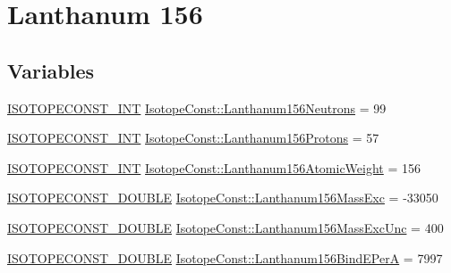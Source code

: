 \hypertarget{group___isotope_const-_lanthanum-_la156}{}\section{Lanthanum 156}
\label{group___isotope_const-_lanthanum-_la156}
\subsection*{Variables}
\begin{DoxyCompactItemize}
\item 
\mbox{\hyperlink{group___isotope_const-_macros_ga5f18360b3e99483a35c32d789e62621c}{I\+S\+O\+T\+O\+P\+E\+C\+O\+N\+S\+T\+\_\+\+I\+NT}} \mbox{\hyperlink{group___isotope_const-_lanthanum-_la156_ga9d9203bdacf6631773b13080eb435763}{Isotope\+Const\+::\+Lanthanum156\+Neutrons}} = 99
\item 
\mbox{\hyperlink{group___isotope_const-_macros_ga5f18360b3e99483a35c32d789e62621c}{I\+S\+O\+T\+O\+P\+E\+C\+O\+N\+S\+T\+\_\+\+I\+NT}} \mbox{\hyperlink{group___isotope_const-_lanthanum-_la156_ga2050811618a7c2782808d69376608865}{Isotope\+Const\+::\+Lanthanum156\+Protons}} = 57
\item 
\mbox{\hyperlink{group___isotope_const-_macros_ga5f18360b3e99483a35c32d789e62621c}{I\+S\+O\+T\+O\+P\+E\+C\+O\+N\+S\+T\+\_\+\+I\+NT}} \mbox{\hyperlink{group___isotope_const-_lanthanum-_la156_gaf8fa9b7781374ff9e8e421fa62c7e9ab}{Isotope\+Const\+::\+Lanthanum156\+Atomic\+Weight}} = 156
\item 
\mbox{\hyperlink{group___isotope_const-_macros_ga8f45a7272ce02c0b4c65c44636ed719a}{I\+S\+O\+T\+O\+P\+E\+C\+O\+N\+S\+T\+\_\+\+D\+O\+U\+B\+LE}} \mbox{\hyperlink{group___isotope_const-_lanthanum-_la156_gaaa57af68ac40b6bb1aa0e6c84d35d1f6}{Isotope\+Const\+::\+Lanthanum156\+Mass\+Exc}} = -\/33050
\item 
\mbox{\hyperlink{group___isotope_const-_macros_ga8f45a7272ce02c0b4c65c44636ed719a}{I\+S\+O\+T\+O\+P\+E\+C\+O\+N\+S\+T\+\_\+\+D\+O\+U\+B\+LE}} \mbox{\hyperlink{group___isotope_const-_lanthanum-_la156_gaa4528d6327136a7e2fc1e7b590e4da6c}{Isotope\+Const\+::\+Lanthanum156\+Mass\+Exc\+Unc}} = 400
\item 
\mbox{\hyperlink{group___isotope_const-_macros_ga8f45a7272ce02c0b4c65c44636ed719a}{I\+S\+O\+T\+O\+P\+E\+C\+O\+N\+S\+T\+\_\+\+D\+O\+U\+B\+LE}} \mbox{\hyperlink{group___isotope_const-_lanthanum-_la156_gaeb0532d06309a4d888476865e0f42041}{Isotope\+Const\+::\+Lanthanum156\+Bind\+E\+PerA}} = 7997
\item 

\end{DoxyCompactItemize}

